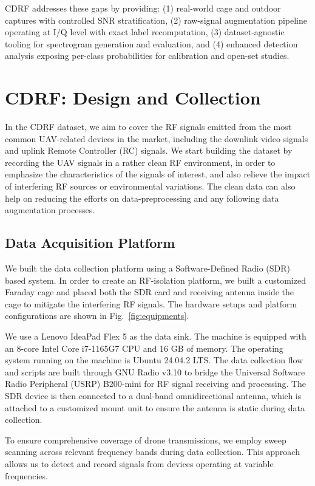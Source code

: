 CDRF addresses these gaps by providing: (1) real-world cage and outdoor captures with controlled SNR stratification, (2) raw-signal augmentation pipeline operating at I/Q level with exact label recomputation, (3) dataset-agnostic tooling for spectrogram generation and evaluation, and (4) enhanced detection analysis exposing per-class probabilities for calibration and open-set studies.



\section{CDRF: Design and Collection}
\label{sec:dataset}

In the CDRF dataset, we aim to cover the RF signals emitted from the most common UAV-related devices in the market, including the downlink video signals and uplink Remote Controller (RC) signals. We start building the dataset by recording the UAV signals in a rather clean RF environment, in order to emphasize the characteristics of the signals of interest, and also relieve the impact of interfering RF sources or environmental variations. The clean data can also help on reducing the efforts on data-preprocessing and any following data augmentation processes. 

\subsection{Data Acquisition Platform}
We built the data collection platform using a Software-Defined Radio (SDR) based system. In order to create an RF-isolation platform, we built a customized Faraday cage and placed both the SDR card and receiving antenna inside the cage to mitigate the interfering RF signals. The hardware setups and platform configurations are shown in Fig.~\ref{fig:equipments}. 

We use a Lenovo IdeaPad Flex 5 as the data sink. The machine is equipped with an 8-core Intel Core i7-1165G7 CPU and 16 GB of memory. The operating system running on the machine is Ubuntu 24.04.2 LTS. The data collection flow and scripts are built through GNU Radio v3.10 to bridge the Universal Software Radio Peripheral (USRP) B200-mini for RF signal receiving and processing. The SDR device is then connected to a dual-band omnidirectional antenna, which is attached to a customized mount unit to ensure the antenna is static during data collection. 

To ensure comprehensive coverage of drone transmissions, we employ sweep scanning across relevant frequency bands during data collection. This approach allows us to detect and record signals from devices operating at variable frequencies.
    
